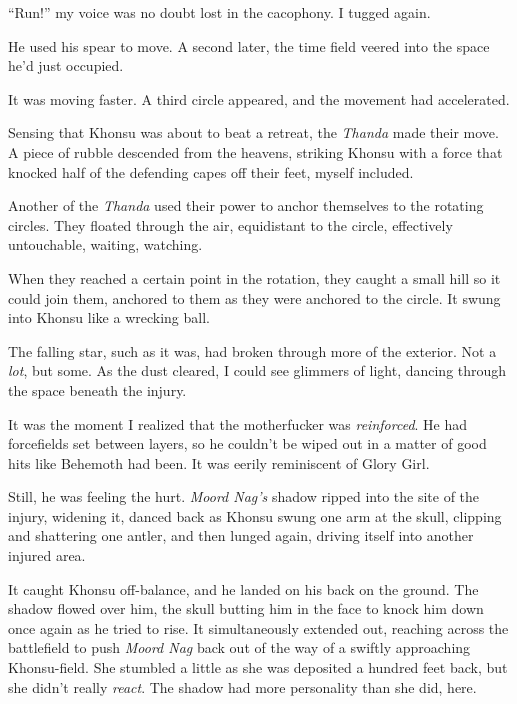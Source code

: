 ``Run!'' my voice was no doubt lost in the cacophony.  I tugged again.



He used his spear to move.  A second later, the time field veered into the space he'd just occupied.



It was moving faster.  A third circle appeared, and the movement had accelerated.



Sensing that Khonsu was about to beat a retreat, the \emph{Thanda} made their move.  A piece of rubble descended from the heavens, striking Khonsu with a force that knocked half of the defending capes off their feet, myself included.



Another of the \emph{Thanda }used their power to anchor themselves to the rotating circles.  They floated through the air, equidistant to the circle, effectively untouchable, waiting, watching.



When they reached a certain point in the rotation, they caught a small hill so it could join them, anchored to them as they were anchored to the circle.  It swung into Khonsu like a wrecking ball.



The falling star, such as it was, had broken through more of the exterior.  Not a \emph{lot}, but some.  As the dust cleared, I could see glimmers of light, dancing through the space beneath the injury.



It was the moment I realized that the motherfucker was \emph{reinforced}.  He had forcefields set between layers, so he couldn't be wiped out in a matter of good hits like Behemoth had been.  It was eerily reminiscent of Glory Girl.



Still, he was feeling the hurt.  \emph{Moord Nag's} shadow ripped into the site of the injury, widening it, danced back as Khonsu swung one arm at the skull, clipping and shattering one antler, and then lunged again, driving itself into another injured area.



It caught Khonsu off-balance, and he landed on his back on the ground.  The shadow flowed over him, the skull butting him in the face to knock him down once again as he tried to rise.  It simultaneously extended out, reaching across the battlefield to push \emph{Moord Nag} back out of the way of a swiftly approaching Khonsu-field.  She stumbled a little as she was deposited a hundred feet back, but she didn't really \emph{react}.  The shadow had more personality than she did, here.



